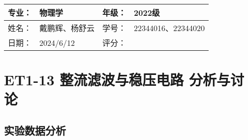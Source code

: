 \documentclass[dvipsnames, svgnames,a4paper,11pt]{article}
\begin{document}
	\begin{figure}[htbp]
		\centering
		\quad
		\quad

		\label{fig:data}
	\end{figure}
	
	
	
	
	
	
	
	\clearpage
	
	\begin{table}
		\renewcommand\arraystretch{1.7}
		\begin{tabularx}{\textwidth}{|X|X|X|X|}
			\hline
			专业：& 物理学 &年级：& 2022级\\
			\hline
			姓名： & 戴鹏辉、杨舒云 & 学号：& 22344016、22344020\\
			\hline
			日期：& 2024/6/12 & 评分： &\\
			\hline
		\end{tabularx}
	\end{table}
	
	\section{ET1-13 整流滤波与稳压电路 \quad\heiti 分析与讨论}
	
	\subsection{实验数据分析}
	
\end{document}
